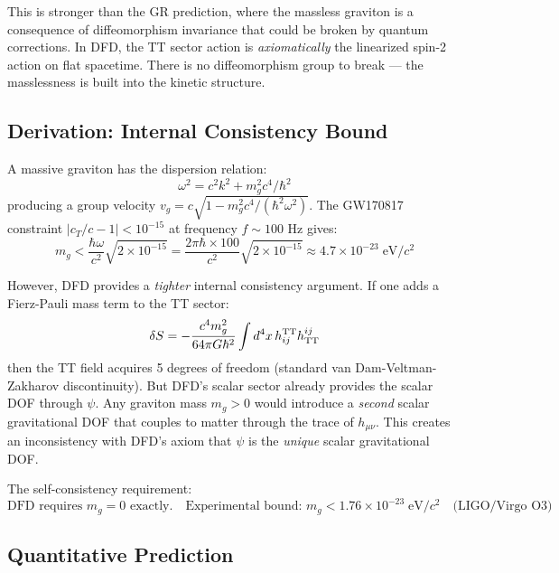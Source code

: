 \documentclass[11pt]{article}
\begin{document}
This is stronger than the GR prediction, where the massless graviton
is a consequence of diffeomorphism invariance that could be broken by
quantum corrections.  In DFD, the TT sector action is \emph{axiomatically}
the linearized spin-2 action on flat spacetime.  There is no diffeomorphism
group to break --- the masslessness is built into the kinetic structure.

\subsection{Derivation: Internal Consistency Bound}

A massive graviton has the dispersion relation:
\begin{equation}
\omega^2 = c^2 k^2 + m_g^2 c^4/\hbar^2
\end{equation}
producing a group velocity $v_g = c\sqrt{1 - m_g^2 c^4/(\hbar^2\omega^2)}$.
The GW170817 constraint $|c_T/c - 1| < 10^{-15}$ at frequency
$f \sim 100$ Hz gives:
\begin{equation}
m_g < \frac{\hbar\omega}{c^2}\sqrt{2\times 10^{-15}}
= \frac{2\pi\hbar \times 100}{c^2}\sqrt{2\times 10^{-15}}
\approx 4.7 \times 10^{-23}\;\text{eV}/c^2
\end{equation}

However, DFD provides a \emph{tighter} internal consistency argument.
If one adds a Fierz-Pauli mass term to the TT sector:
\begin{equation}
\delta S = -\frac{c^4 m_g^2}{64\pi G\hbar^2}\int d^4x\,h_{ij}^{\rm TT}h^{ij}_{\rm TT}
\end{equation}
then the TT field acquires 5 degrees of freedom (standard van Dam-Veltman-Zakharov
discontinuity).  But DFD's scalar sector already provides the scalar
DOF through $\psi$.  Any graviton mass $m_g > 0$ would introduce a
\emph{second} scalar gravitational DOF that couples to matter through
the trace of $h_{\mu\nu}$.  This creates an inconsistency with DFD's
axiom that $\psi$ is the \emph{unique} scalar gravitational DOF.

The self-consistency requirement:
\begin{equation}
\boxed{
\text{DFD requires } m_g = 0 \text{ exactly.}
\quad\text{Experimental bound: } m_g < 1.76 \times 10^{-23}\;\text{eV}/c^2
\quad\text{(LIGO/Virgo O3)}
}
\end{equation}

\subsection{Quantitative Prediction}
\end{document}
